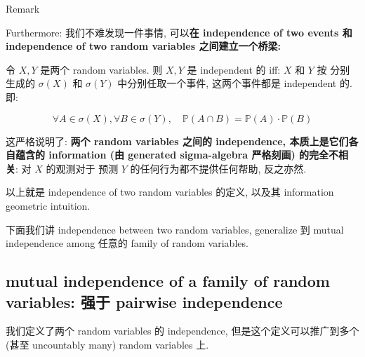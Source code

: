 \begin{qlremark}{Remark}

Furthermore: 我们不难发现一件事情, 可以\textbf{在 independence of two events 和 independence of two random variables 之间建立一个桥梁:}

\begin{proposition}{}

令 \(\mathit{X},\mathit{Y}\) 是两个 random variables. 则 \(\mathit{X},\mathit{Y}\) 是 independent 的 iff: \(\mathit{X}\) 和 \(\mathit{Y}\) 按  分别生成的 \(\mathit{\sigma}(\mathit{X})\) 和 \(\mathit{\sigma}(\mathit{Y})\) 中分别任取一个事件, 这两个事件都是 independent 的. 即:

\[\forall\mathit{A} \in \mathit{\sigma}(\mathit{X}),\forall\mathit{B} \in \mathit{\sigma}(\mathit{Y}),\quad\mathbb{P}(\mathit{A} \cap \mathit{B}) = \mathbb{P}(\mathit{A}) \cdot \mathbb{P}(\mathit{B})\]

\end{proposition}

这严格说明了: \textbf{两个 random variables 之间的 independence, 本质上是它们各自蕴含的 information (由 generated sigma-algebra 严格刻画) 的完全不相关}: 对 \(\mathit{X}\) 的观测对于 预测 \(\mathit{Y}\) 的任何行为都不提供任何帮助, 反之亦然.\\

\end{qlremark}

以上就是 independence of two random variables 的定义, 以及其 information geometric intuition.

下面我们讲 independence between two random variables, generalize 到 mutual independence among 任意的 family of random variables.

\subsection{mutual independence of a family of random variables: 强于 pairwise independence}\label{mutual-independence-of-a-family-of-random-variables-ux5f3aux4e8e-pairwise-independence}

我们定义了两个 random variables 的 independence, 但是这个定义可以推广到多个 (甚至 uncountably many) random variables 上.

